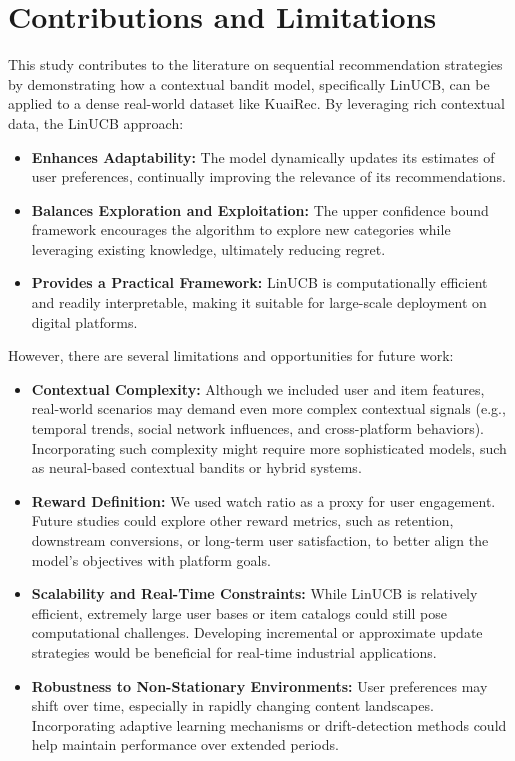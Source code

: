 \section{Contributions and Limitations}

This study contributes to the literature on sequential recommendation strategies by demonstrating how a contextual bandit model, specifically LinUCB, can be applied to a dense real-world dataset like KuaiRec. By leveraging rich contextual data, the LinUCB approach:

\begin{itemize}
    \item \textbf{Enhances Adaptability:} The model dynamically updates its estimates of user preferences, continually improving the relevance of its recommendations.
    \item \textbf{Balances Exploration and Exploitation:} The upper confidence bound framework encourages the algorithm to explore new categories while leveraging existing knowledge, ultimately reducing regret.
    \item \textbf{Provides a Practical Framework:} LinUCB is computationally efficient and readily interpretable, making it suitable for large-scale deployment on digital platforms.
\end{itemize}

However, there are several limitations and opportunities for future work:

\begin{itemize}
    \item \textbf{Contextual Complexity:} Although we included user and item features, real-world scenarios may demand even more complex contextual signals (e.g., temporal trends, social network influences, and cross-platform behaviors). Incorporating such complexity might require more sophisticated models, such as neural-based contextual bandits or hybrid systems.
    
    \item \textbf{Reward Definition:} We used watch ratio as a proxy for user engagement. Future studies could explore other reward metrics, such as retention, downstream conversions, or long-term user satisfaction, to better align the model’s objectives with platform goals.

    \item \textbf{Scalability and Real-Time Constraints:} While LinUCB is relatively efficient, extremely large user bases or item catalogs could still pose computational challenges. Developing incremental or approximate update strategies would be beneficial for real-time industrial applications.
    
    \item \textbf{Robustness to Non-Stationary Environments:} User preferences may shift over time, especially in rapidly changing content landscapes. Incorporating adaptive learning mechanisms or drift-detection methods could help maintain performance over extended periods.
\end{itemize}

